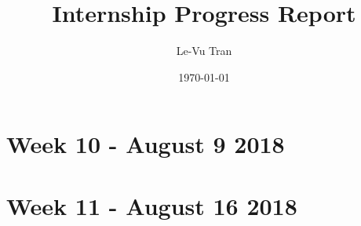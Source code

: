 \documentclass[a4paper]{report}
\title{Internship Progress Report}
\author{Le-Vu Tran}
\date{\today}
\begin{document}
\maketitle

\tableofcontents

\iffalse
\chapter{Week 1 - June 7, 2018}


\chapter{Week 2 - June 12, 2018}


\chapter{Week 3 - June 19, 2018}


\chapter{Week 4 - June 26, 2018}


\chapter{Week 5 - July 5 2018}


\chapter{Week 6 - July 12 2018}


\chapter{Week 7 - July 19 2018}


\chapter{Week 8 - July 26 2018}


\chapter{Week 9 - August 2 2018}

\fi
\chapter{Week 10 - August 9 2018}


\chapter{Week 11 - August 16 2018}



\end{document}
